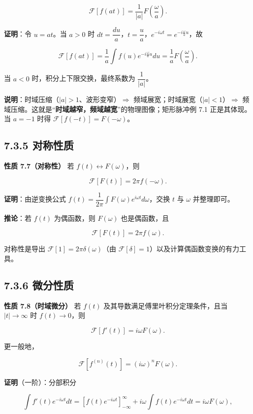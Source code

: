 \[
\mathcal F[f(at)]=\frac{1}{|a|}F\left(\frac{\omega}{a}\right).
\]

\textbf{证明}：令 \(u=at\)。当 \(a>0\) 时
\(dt=\dfrac{du}{a}\)，\(t=\dfrac{u}{a}\)，\(e^{-i\omega t}=e^{-i\frac{\omega}{a}u}\)，故

\[
\mathcal F[f(at)]=\frac{1}{a}\int f(u)e^{-i\frac{\omega}{a}u}du=\frac{1}{a}F\left(\frac{\omega}{a}\right).
\]

当 \(a<0\) 时，积分上下限交换，最终系数为 \(\dfrac{1}{|a|}\)。

\textbf{说明}：时域压缩（\(|a|>1\)、波形变窄）\(\Rightarrow\)
频域展宽；时域展宽（\(|a|<1\)）\(\Rightarrow\)
频域压缩。这就是``\textbf{时域越窄，频域越宽}''的物理图像；矩形脉冲例
7.1 正是其体现。当 \(a=-1\) 时得 \(\mathcal F[f(-t)]=F(-\omega)\)。

\subsection{7.3.5 对称性质}\label{ux5bf9ux79f0ux6027ux8d28}

\textbf{性质 7.7（对称性）} 若 \(f(t)\leftrightarrow F(\omega)\)，则

\[
\mathcal F[F(t)]=2\pi f(-\omega).
\]

\textbf{证明}：由逆变换公式
\(f(t)=\dfrac{1}{2\pi}\int F(\omega)e^{i\omega t}d\omega\)，交换 \(t\)
与 \(\omega\) 并整理即可。

\textbf{推论}：若 \(f(t)\) 为偶函数，则 \(F(\omega)\) 也是偶函数，且

\[
\mathcal F[F(t)]=2\pi f(\omega).
\]

对称性是导出 \(\mathcal F[1]=2\pi\delta(\omega)\)（由
\(\mathcal F[\delta]=1\)）以及计算偶函数变换的有力工具。

\subsection{7.3.6 微分性质}\label{ux5faeux5206ux6027ux8d28}

\textbf{性质 7.8（时域微分）} 若 \(f(t)\)
及其导数满足傅里叶积分定理条件，且当 \(|t|\to\infty\) 时
\(f(t)\to 0\)，则

\[
\mathcal F[f'(t)]=i\omega F(\omega).
\]

更一般地，

\[
\mathcal F\left[f^{(n)}(t)\right]=(i\omega)^n F(\omega).
\]

\textbf{证明}（一阶）：分部积分

\[
\int f'(t)e^{-i\omega t}dt=\left[f(t)e^{-i\omega t}\right]_{-\infty}^{\infty}+i\omega\int f(t)e^{-i\omega t}dt=i\omega F(\omega),
\]

